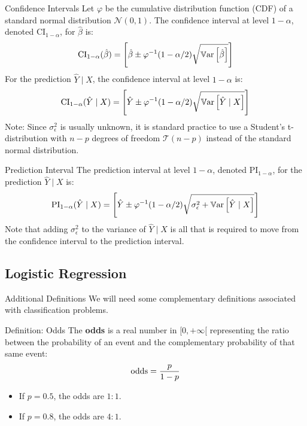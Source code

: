 \begin{frame}{Confidence Intervals}
	Let $\varphi$ be the cumulative distribution function (CDF) of a standard normal distribution $\mathcal{N}(0, 1)$. The confidence interval at level $1-\alpha$, denoted $\text{CI}_{1-\alpha}$, for $\hat{\beta}$ is:
	\begin{equation}
		\text{CI}_{1-\alpha}(\hat{\beta}) = \left[\hat{\beta} \pm \varphi^{-1}(1-\alpha / 2) \sqrt{\operatorname{\mathbb{V}ar}\left[\hat{\beta}\right]}\right]
		\nonumber
	\end{equation}
	\pause
	For the prediction $\hat{Y} \mid X$, the confidence interval at level $1-\alpha$ is:
	\begin{equation}
		\begin{split}
			\text{CI}_{1-\alpha}(\hat{Y} \mid X) = \Biggl[ \hat{Y} \pm \varphi^{-1}(1-\alpha / 2) \sqrt{\operatorname{\mathbb{V}ar}\left[\hat{Y} \mid X\right]} \Biggr]
		\end{split}
		\nonumber
	\end{equation}
	\pause
	Note: Since $\sigma_{\epsilon}^2$ is usually unknown, it is standard practice to use a Student's t-distribution with $n - p$ degrees of freedom $\mathcal{T}(n - p)$ instead of the standard normal distribution.
\end{frame}

\begin{frame}{Prediction Interval}
	The prediction interval at level $1-\alpha$, denoted $\text{PI}_{1-\alpha}$, for the prediction $\hat{Y} \mid X$ is:
	\begin{equation}
		\begin{split}
			\text{PI}_{1-\alpha}(\hat{Y} \mid X) = \Biggl[ \hat{Y} \pm \varphi^{-1}(1-\alpha / 2) \sqrt{\sigma_{\epsilon}^2 + \operatorname{\mathbb{V}ar}\left[\hat{Y} \mid X\right]} \Biggr]
		\end{split}
		\nonumber
	\end{equation}
	\pause
	Note that adding $\sigma_{\epsilon}^2$ to the variance of $\hat{Y} \mid X$ is all that is required to move from the confidence interval to the prediction interval.
\end{frame}

\subsection[Logistic Regression]{Logistic Regression}

\begin{frame}{Additional Definitions}
	We will need some complementary definitions associated with classification problems.
	\begin{block}{Definition: Odds}
		The \textbf{odds} is a real number in $[0, +\infty[$ representing the ratio between the probability of an event and the complementary probability of that same event:
		\begin{equation}
			\operatorname{odds} = \frac{p}{1 - p}
			\nonumber
		\end{equation}
	\end{block}
	\pause
	\begin{itemize}
		\item If $p=0.5$, the odds are $1:1$.
		\item If $p=0.8$, the odds are $4:1$.
	\end{itemize}	
\end{frame}

